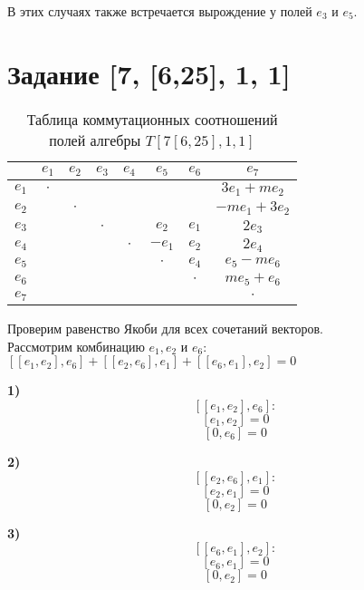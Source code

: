 \documentclass[12pt]{article}
\begin{document}
В этих случаях также встречается вырождение у полей $e_3$ и $e_5$.
\pagebreak

\section{Задание [7, [6,25], 1, 1]}

\begin{table}[h!]
    \centering
    \renewcommand{\arraystretch}{1.5}
    \setlength{\arrayrulewidth}{0.3mm}
    \begin{tabular}{|c|c|c|c|c|c|c|c|}
        \hline
    & $e_1$ & $e_2$ & $e_3$ & $e_4$ & $e_5$ & $e_6$ & $e_7$ \\
        \hline
        $e_1$ & $\cdot$ & & & & & & $3e_1 + me_2$\\
        \hline
        $e_2$ & & $\cdot$ & & & & & $-me_1+3e_2$\\
        \hline
        $e_3$ & & & $\cdot$ & & $e_2$ & $e_1$ & $2e_3$\\
        \hline
        $e_4$ & & & & $\cdot$ & $-e_1$ & $e_2$ & $2e_4$ \\
        \hline
        $e_5$ & & & & & $\cdot$ & $e_4$ & $e_5-me_6$ \\
        \hline
        $e_6$ & & & & & & $\cdot$ & $me_5+e_6$ \\
        \hline
        $e_7$ & & & & & & & $\cdot$ \\
        \hline
    \end{tabular}
    \caption{Таблица коммутационных соотношений полей алгебры $T [7[6,25],1,1]$}
\end{table}

Проверим равенство Якоби для всех сочетаний векторов. \\

Рассмотрим комбинацию \(e_1, e_2\) и \(e_6:\) \\

$[[e_1, e_2], e_6] + [[e_2, e_6], e_1] + [[e_6, e_1], e_2] = 0$ \\

\begin{minipage}[t]{0.2\textwidth}
\textbf{1)}\\
\[
[[e_1, e_2], e_6]: 
\]
\[
[e_1, e_2] = 0 
\]
\[
[0, e_6] = 0 
\]
\end{minipage}%
\hfill
\begin{minipage}[t]{0.32\textwidth}
\textbf{2)}\\
\[
[[e_2, e_6], e_1]: 
\]
\[
[e_2, e_1] = 0 
\]
\[
[0, e_2] = 0 
\]
\end{minipage}%
\hfill
\begin{minipage}[t]{0.2\textwidth}
\textbf{3)}\\
\[
[[e_6, e_1], e_2]: 
\]
\[
[e_6, e_1] = 0 
\]
\[
[0, e_2] = 0 
\]
\end{minipage}\\
\end{document}
